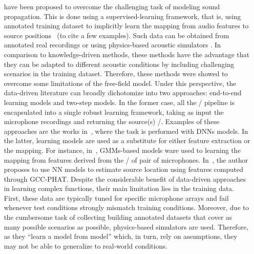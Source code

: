  have been proposed to overcome the challenging task of modeling sound propagation.
This is done using a supervised-learning framework, that is, using annotated training dataset to implicitly learn the mapping from audio features to source positions~
(to cite a few examples).
Such data can be obtained from annotated real recordings  or using physics-based acoustic simulators .
In comparison to knowledge-driven methods, these methods have the advantage that they can be adapted to different acoustic conditions by including challenging scenarios in the training dataset.
Therefore, these methods were showed to overcome some limitations of the free-field model.
Under this perspective, the data-driven literature can broadly dichotomize into two approaches: end-to-end learning models and two-step models.
In the former case, all the \SSL/ pipeline is encapsulated into a single robust learning framework, taking as input the microphone recordings and returning the source(s) \DOAs/.
Examples of these approaches are the works in~, where the task is performed with \acp{DNN} models.
In the latter, learning models are used as a substitute for either feature extraction or the mapping.
For instance, in~, \acp{GMM}-based models ware used to learning the mapping from features derived from the \ReTF/ of pair of microphones.
In~, the author proposes to use \ac{NN} models to estimate source location using features computed through \ac{GCC-PHAT}.
Despite the considerable benefit of data-driven approaches in learning complex functions, their main limitation lies in the training data.
First, these data are typically tuned for specific microphone arrays and fail whenever test conditions strongly mismatch training conditions.
Moreover, due to the cumbersome task of collecting building annotated datasets that cover as many possible scenarios as possible, physics-based simulators are used.
Therefore, as they ``learn a model from model'' which, in turn, rely on assumptions, they may not be able to generalize to real-world conditions.


